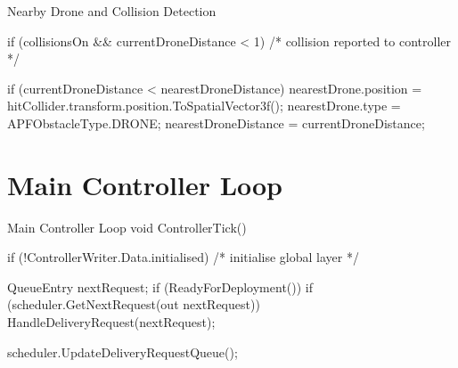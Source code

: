 \documentclass[a4paper,12pt,titlepage]{article}
\begin{document}
\begin{appendices}
\begin{sexylisting}[colback=white]{Nearby Drone and Collision Detection}
{{{      if (collisionsOn && currentDroneDistance < 1)
      {
        /* collision reported to controller */
      }

      if (currentDroneDistance < nearestDroneDistance)
      {
        nearestDrone.position
          = hitCollider.transform.position.ToSpatialVector3f();
        nearestDrone.type = APFObstacleType.DRONE;
        nearestDroneDistance = currentDroneDistance;
      }
    }
  }
}
\end{sexylisting}

\section{Main Controller Loop}
\begin{sexylisting}[colback=white]{Main Controller Loop}
void ControllerTick()
{
  if (!ControllerWriter.Data.initialised)
  {
    /* initialise global layer */
  }

  QueueEntry nextRequest;
  if (ReadyForDeployment())
  {
    if (scheduler.GetNextRequest(out nextRequest))
    {
      HandleDeliveryRequest(nextRequest);
    }
  }

  scheduler.UpdateDeliveryRequestQueue();
}
\end{sexylisting}

\end{appendices}
\end{document}
